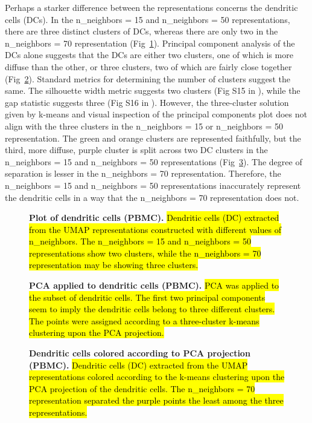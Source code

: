 \documentclass[10pt,letterpaper]{article}
\begin{document}
Perhaps a starker difference between the representations concerns the dendritic cells (DCs). In the n\_neighbors = 15 and n\_neighbors = 50 representations, there are three distinct clusters of DCs, whereas there are only two in the n\_neighbors = 70 representation (Fig~\ref{fig18}). Principal component analysis of the DCs alone suggests that the DCs are either two clusters, one of which is more diffuse than the other, or three clusters, two of which are fairly close together (Fig~\ref{fig19}). Standard metrics for determining the number of clusters suggest the same. The silhouette width metric suggests two clusters (Fig S15 in ), while the gap statistic suggests three (Fig S16 in ). However, the three-cluster solution given by k-means and visual inspection of the principal components plot does not align with the three clusters in the n\_neighbors = 15 or n\_neighbors = 50 representation. The green and orange clusters are represented faithfully, but the third, more diffuse, purple cluster is split across two DC clusters in the n\_neighbors = 15 and n\_neighbors = 50 representations (Fig~\ref{fig20}). The degree of separation is lesser in the n\_neighbors = 70 representation. Therefore, the n\_neighbors = 15 and n\_neighbors = 50 representations inaccurately represent the dendritic cells in a way that the n\_neighbors = 70 representation does not.

\begin{figure}[!h]
\caption{{\bf Plot of dendritic cells (PBMC).}
\hl{Dendritic cells (DC) extracted from the UMAP representations constructed with different values of n\_neighbors. The n\_neighbors = 15 and n\_neighbors = 50 representations show two clusters, while the n\_neighbors = 70 representation may be showing three clusters.}}
\label{fig18}
\end{figure}

\begin{figure}[!h]
\caption{{\bf PCA applied to dendritic cells (PBMC).}
\hl{PCA was applied to the subset of dendritic cells. The first two principal components seem to imply the dendritic cells belong to three different clusters. The points were assigned according to a three-cluster k-means clustering upon the PCA projection. }}
\label{fig19}
\end{figure}

\begin{figure}[!h]
\caption{{\bf Dendritic cells colored according to PCA projection (PBMC).}
\hl{Dendritic cells (DC) extracted from the UMAP representations colored according to the k-means clustering upon the PCA projection of the dendritic cells. The n\_neighbors = 70 representation separated the purple points the least among the three representations.}}
\label{fig20}
\end{figure}
\end{document}
